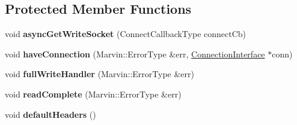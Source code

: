 \subsection*{Protected Member Functions}
\begin{DoxyCompactItemize}
\item 
\mbox{\label{class_request_ad6d505e24ef5b1038d5820d3541df091}} 
void {\bfseries async\+Get\+Write\+Socket} (Connect\+Callback\+Type connect\+Cb)
\item 
\mbox{\label{class_request_a79a3f10ae291bd48c7b7664d7a7c5419}} 
void {\bfseries have\+Connection} (Marvin\+::\+Error\+Type \&err, \hyperlink{class_connection_interface}{Connection\+Interface} $\ast$conn)
\item 
\mbox{\label{class_request_a03ba174751dad7a36ce9706f9a067aa0}} 
void {\bfseries full\+Write\+Handler} (Marvin\+::\+Error\+Type \&err)
\item 
\mbox{\label{class_request_aff1b5c9d9b7760186179ec5cb911d2a4}} 
void {\bfseries read\+Complete} (Marvin\+::\+Error\+Type \&err)
\item 
\mbox{\label{class_request_abebb155c39c86a63113f1998a7cb28d6}} 
void {\bfseries default\+Headers} ()
\end{DoxyCompactItemize}
